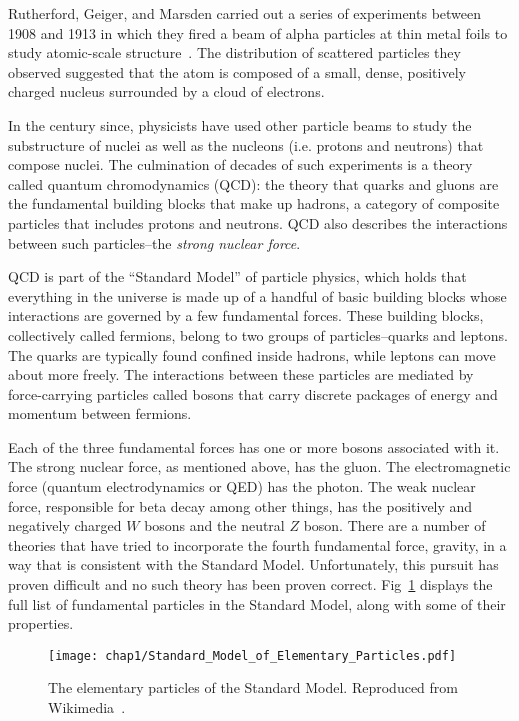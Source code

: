 Rutherford, Geiger, and Marsden carried out a series of experiments between
1908 and 1913 in which they fired a beam of alpha particles
at thin metal foils to study atomic-scale structure~\cite{Rutherford_1911}.
The distribution of scattered particles they observed suggested that the atom
is composed of a small, dense, positively charged nucleus surrounded by a cloud
of electrons.

In the century since, physicists have used other particle beams to study the
substructure of nuclei as well as the nucleons (i.e. protons and neutrons)
that compose nuclei.
The culmination of decades of such experiments is a theory called quantum
chromodynamics (QCD): the theory that quarks and gluons are the fundamental
building blocks that make up hadrons, a category of composite particles that
includes protons and neutrons.
QCD also describes the interactions between such particles--the
\textit{strong nuclear force}.


QCD is part of the ``Standard Model'' of particle physics, which holds that
everything in the universe is made up of a handful of basic building blocks
whose interactions are governed by a few fundamental forces.
These building blocks, collectively called fermions, belong to two groups of
particles--quarks and leptons.
The quarks are typically found confined inside hadrons, while leptons can move
about more freely.
The interactions between these particles are mediated by force-carrying
particles called bosons that carry discrete packages of energy and momentum
between fermions.

Each of the three fundamental forces has one or more bosons associated with it.
The strong nuclear force, as mentioned above, has the gluon.
The electromagnetic force (quantum electrodynamics or QED) has the photon.
The weak nuclear force, responsible for beta decay among other things, has the
positively and negatively charged $W$ bosons and the neutral $Z$ boson.
There are a number of theories that have tried to incorporate the fourth
fundamental force, gravity, in a way that is consistent with the Standard
Model.
Unfortunately, this pursuit has proven difficult and no such theory has been
proven correct.
Fig~\ref{fig:Standard_Model_of_Elementary_Particles} displays the full list
of fundamental particles in the Standard Model, along with some of their
properties.

\begin{figure}[!h]
    \centering
    \texttt{[image: chap1/Standard\_Model\_of\_Elementary\_Particles.pdf]}
    \caption{The elementary particles of the Standard Model. Reproduced from
             Wikimedia~\cite{standard_model_wikimedia}.
            }
    \label{fig:Standard_Model_of_Elementary_Particles}
\end{figure}


